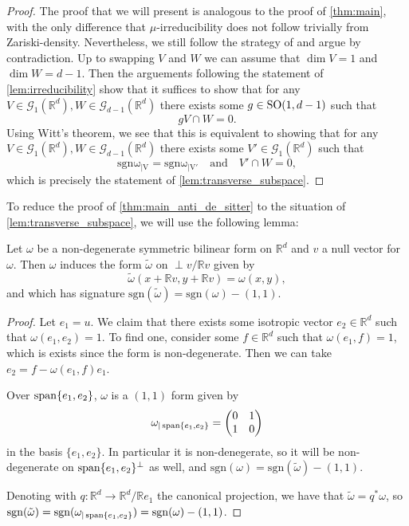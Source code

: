 \documentclass{report}
\begin{document}
\begin{proof}
    The proof that we will present is analogous to the proof of \cref{thm:main}, with the only difference that $\mu$-irreducibility does not follow trivially from Zariski-density.
    Nevertheless, we still follow the strategy of \cite{pozzetti_anosov_2023} and argue by contradiction.
    Up to swapping $V$ and $W$ we can assume that $\dim V = 1$ and $\dim W = d - 1$.
    Then the arguements following the statement of \cref{lem:irreducibility} show that it suffices to show that for any $V \in \mathcal G_1(\mathbb R^d), W \in \mathcal G_{d-1}(\mathbb R^d)$ there exists some $g \in \operatorname{{\mathrm{SO}}}(1,d-1)$ such that
    \[
    g V \cap W = 0.
    \]  
    Using Witt's theorem, we see that this is equivalent to showing that for any $V \in \mathcal G_1(\mathbb R^d), W \in \mathcal G_{d-1}(\mathbb R^d)$ there exists some $V' \in \mathcal G_1(\mathbb R^d)$ such that
    \[
    \mathrm{sgn \omega_{|V}} = \mathrm{sgn \omega_{|V'}} \quad \text{and} \quad V' \cap W = 0,
    \]
    which is precisely the statement of \cref{lem:transverse_subspace}.
\end{proof}

To reduce the proof of \cref{thm:main_anti_de_sitter} to the situation of \cref{lem:transverse_subspace}, we will use the following lemma:
\begin{lemma}\label{lem:induced_form}
    Let $\omega$ be a non-degenerate symmetric bilinear form on $\mathbb R^d$ and $v$ a null vector for $\omega$.
    Then $\omega$ induces the form $\tilde{\omega}$ on $\perp v / \mathbb R v$ given by
    \[
    \tilde \omega(x + \mathbb Rv, y + \mathbb Rv) = \omega(x,y),
    \]
    and which has signature $\mathrm{sgn}( \tilde \omega) = \mathrm{sgn}(\omega) - (1,1)$.
\end{lemma}
\begin{proof}
    Let $e_1 = u$.
    We claim that there exists some isotropic vector $e_2 \in \mathbb R^d$ such that $\omega(e_1, e_2) = 1$.
    To find one, consider some $f \in \mathbb R^d$ such that $\omega(e_1, f) = 1$, which is exists since the form is non-degenerate.
    Then we can take $e_2 = f - \omega(e_1, f)e_1$. 

    Over $\operatorname{span}\{e_1, e_2\}$, $\omega$ is a $(1,1)$ form given by
    \[
    \omega_{|\operatorname{span}\{e_1, e_2\}} = \begin{pmatrix}
        0 & 1 \\
        1 & 0
    \end{pmatrix}
    \]
    in the basis $\{e_1, e_2\}$. 
    In particular it is non-denegerate, so it will be non-degenerate on $\operatorname{span}\{e_1, e_2\}^\perp$ as well, and $\mathrm{sgn}(\omega) = \mathrm{sgn}(\tilde \omega) - (1,1)$.
    
    Denoting with $q: \mathbb R^d \to \mathbb R^d/\mathbb R e_1$ the canonical projection, we have that $\tilde \omega = q^* \omega$, so $\mathrm{sgn}(\tilde \omega) = \mathrm{sgn}(\omega_{|\operatorname{span}\{e_1, e_2\}}) = \mathrm{sgn}(\omega) - (1,1)$.
\end{proof}
\end{document}
